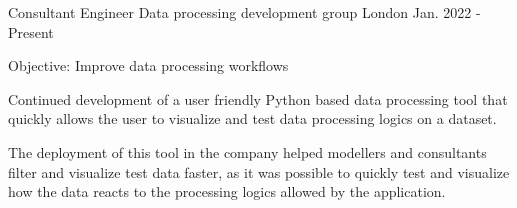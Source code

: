 \begin{cventries}
  \cventry
    {Consultant Engineer} %
    {Data processing development group} %
    {London} %
    {Jan. 2022 - Present} %
    {
      \begin{cvitems} %
        \item {Objective: Improve data processing workflows }
        \item {Continued development of a user friendly Python based data processing tool that quickly allows the user to visualize and test data processing logics on a dataset. }
        \item {The deployment of this tool in the company helped modellers and consultants filter and visualize test data faster, as it was possible to quickly test and visualize how the data reacts to the processing logics allowed by the application. }
       \end{cvitems}
    }


\end{cventries}
